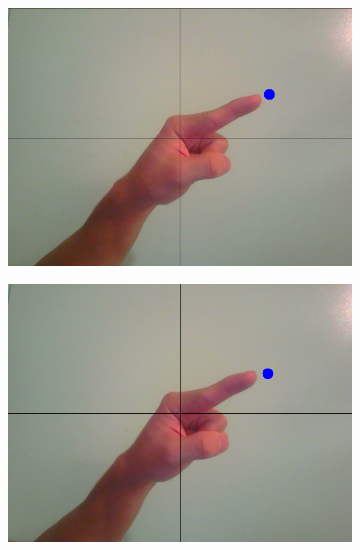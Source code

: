 \documentclass[10pt,twocolumn,letterpaper]{article}
\begin{document}
\begin{center}
\begin{figure}[t]
	\label{fig:pointErrors}
\end{figure}
\begin{figure}[b]
	\begin{center}
		\begin{subfigure}[b]{0.3\textwidth}
			\includegraphics[width=\textwidth]{figures/PointFarImage.png}
			\caption{} %
			\label{fig:pointFarImage}
		\end{subfigure}
		\begin{subfigure}[b]{0.3\textwidth}
			\includegraphics[width=\textwidth]{figures/PointCloseImage.png}
			\caption{}
			\label{fig:pointCloseImage}
		\end{subfigure}
		~\\

\end{center}
\end{figure}
\end{center}
\end{document}

